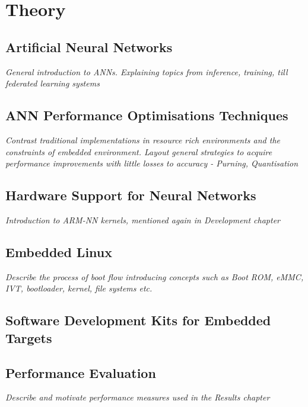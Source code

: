 \chapter{Theory}

\section[Artificial Neural Network (ANN)]{Artificial Neural Networks}
\textit{General introduction to ANNs. Explaining topics from inference, training, till federated learning systems}

\section{ANN Performance Optimisations Techniques}
\textit{Contrast traditional implementations in resource rich environments and the constraints of embedded environment. Layout general strategies to acquire performance improvements with little losses to accuracy - Purning, Quantisation}

\section{Hardware Support for Neural Networks}
\textit{Introduction to ARM-NN kernels, mentioned again in Development chapter}

\section{Embedded Linux}
\textit{Describe the process of boot flow introducing concepts such as Boot ROM, eMMC, IVT, bootloader, kernel, file systems etc.}

\section{Software Development Kits for Embedded Targets}

\section{Performance Evaluation}
\textit{Describe and motivate performance measures used in the Results chapter}
